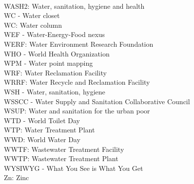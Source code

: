 \documentclass{article}
\begin{document}
\vspace{0.3cm}\\
WASH2:  Water, sanitation, hygiene and health
\vspace{0.3cm}\\
WC - Water closet
\vspace{0.3cm}\\
WC:  Water column
\vspace{0.3cm}\\
WEF - Water-Energy-Food nexus
\vspace{0.3cm}\\
WERF:  Water Environment Research Foundation
\vspace{0.3cm}\\
WHO - World Health Organization
\vspace{0.3cm}\\
WPM - Water point mapping
\vspace{0.3cm}\\
WRF:  Water Reclamation Facility
\vspace{0.3cm}\\
WRRF:  Water Recycle and Reclamation Facility
\vspace{0.3cm}\\
WSH - Water, sanitation, hygiene
\vspace{0.3cm}\\
WSSCC - Water Supply and Sanitation Collaborative Council
\vspace{0.3cm}\\
WSUP:  Water and sanitation for the urban poor
\vspace{0.3cm}\\
WTD - World Toilet Day
\vspace{0.3cm}\\
WTP:  Water Treatment Plant
\vspace{0.3cm}\\
WWD:  World Water Day
\vspace{0.3cm}\\
WWTF:  Wastewater Treatment Facility
\vspace{0.3cm}\\
WWTP:  Wastewater Treatment Plant
\vspace{0.3cm}\\
WYSIWYG - What You See is What You Get
\vspace{0.3cm}\\
Zn:  Zinc
\end{document}
